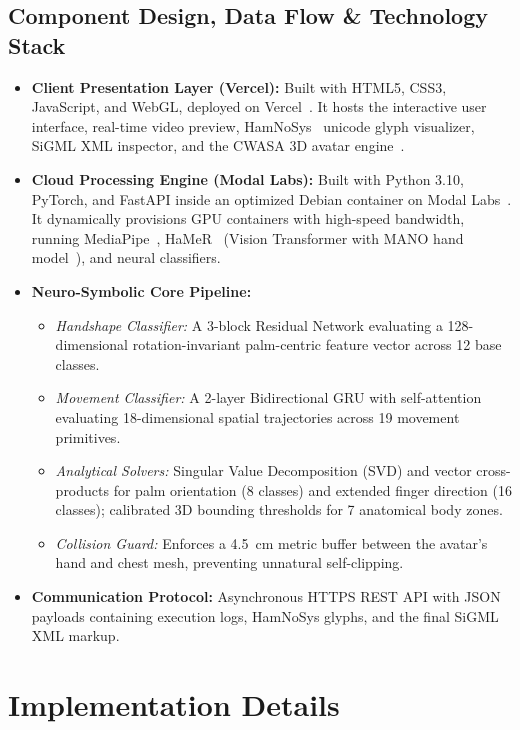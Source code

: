 \documentclass[11pt, a4paper]{article}
\begin{document}
\subsection{Component Design, Data Flow \& Technology Stack}
\begin{itemize}[noitemsep, topsep=2pt]
    \item \textbf{Client Presentation Layer (Vercel):} Built with HTML5, CSS3, JavaScript, and WebGL, deployed on Vercel~\cite{vercel2024}. It hosts the interactive user interface, real-time video preview, HamNoSys~\cite{prillwitz1989} unicode glyph visualizer, SiGML XML inspector, and the CWASA 3D avatar engine~\cite{kennaway2002,kennaway2007}.
    \item \textbf{Cloud Processing Engine (Modal Labs):} Built with Python 3.10, PyTorch, and FastAPI inside an optimized Debian container on Modal Labs~\cite{modal2024}. It dynamically provisions GPU containers with high-speed bandwidth, running MediaPipe~\cite{lugaresi2019}, HaMeR~\cite{pavlakos2024} (Vision Transformer with MANO hand model~\cite{romero2017}), and neural classifiers.
    \item \textbf{Neuro-Symbolic Core Pipeline:}
    \begin{itemize}[noitemsep]
        \item \emph{Handshape Classifier:} A 3-block Residual Network evaluating a 128-dimensional rotation-invariant palm-centric feature vector across 12 base classes.
        \item \emph{Movement Classifier:} A 2-layer Bidirectional GRU with self-attention evaluating 18-dimensional spatial trajectories across 19 movement primitives.
        \item \emph{Analytical Solvers:} Singular Value Decomposition (SVD) and vector cross-products for palm orientation (8 classes) and extended finger direction (16 classes); calibrated 3D bounding thresholds for 7 anatomical body zones.
        \item \emph{Collision Guard:} Enforces a 4.5~cm metric buffer between the avatar's hand and chest mesh, preventing unnatural self-clipping.
    \end{itemize}
    \item \textbf{Communication Protocol:} Asynchronous HTTPS REST API with JSON payloads containing execution logs, HamNoSys glyphs, and the final SiGML XML markup.
\end{itemize}

\section{Implementation Details}
\end{document}
